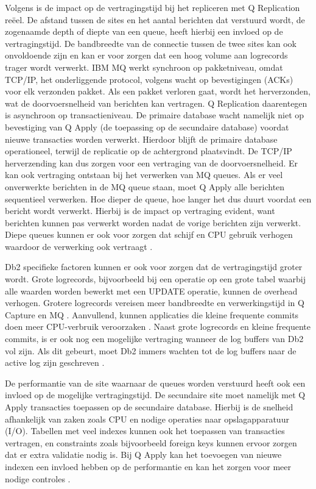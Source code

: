 Volgens \textcite{sharkey_2018_ibm_performance_q_replication} is de impact op de vertragingstijd bij het repliceren met Q Replication reëel.
De afstand tussen de sites en het aantal berichten dat verstuurd wordt, de zogenaamde depth of diepte van een queue, heeft hierbij een invloed op de vertragingstijd.
De bandbreedte van de connectie tussen de twee sites kan ook onvoldoende zijn en kan er voor zorgen dat een hoog volume aan logrecords trager wordt verwerkt.
IBM MQ werkt synchroon op pakketniveau, omdat TCP/IP, het onderliggende protocol, volgens \textcite{borman_2014_tcp} wacht op bevestigingen (ACKs) voor elk verzonden pakket. 
Als een pakket verloren gaat, wordt het herverzonden, wat de doorvoersnelheid van berichten kan vertragen.
Q Replication daarentegen is asynchroon op transactieniveau.
De primaire database wacht namelijk niet op bevestiging van Q Apply (de toepassing op de secundaire database) voordat nieuwe transacties worden verwerkt. 
Hierdoor blijft de primaire database operationeel, terwijl de replicatie op de achtergrond plaatsvindt. 
De TCP/IP herverzending kan dus zorgen voor een vertraging van de doorvoersnelheid.
Er kan ook vertraging ontstaan bij het verwerken van MQ queues.
Als er veel onverwerkte berichten in de MQ queue staan, moet Q Apply alle berichten sequentieel verwerken.
Hoe dieper de queue, hoe langer het dus duurt voordat een bericht wordt verwerkt.
Hierbij is de impact op vertraging evident, want berichten kunnen pas verwerkt worden nadat de vorige berichten zijn verwerkt.
Diepe queues kunnen er ook voor zorgen dat schijf en CPU gebruik verhogen waardoor de verwerking ook vertraagt \autocite{sharkey_2018_ibm_performance_q_replication}.

Db2 specifieke factoren kunnen er ook voor zorgen dat de vertragingstijd groter wordt.
Grote logrecords, bijvoorbeeld bij een operatie op een grote tabel waarbij alle waarden worden bewerkt met een UPDATE operatie, kunnen de overhead verhogen.
Grotere logrecords vereisen meer bandbreedte en verwerkingstijd in Q Capture en MQ \autocite{ibm_2004_ibm_replication_event_publishing_guide}.
Aanvullend, kunnen applicaties die kleine frequente commits doen meer CPU-verbruik veroorzaken \autocite{ibm_2025_infosphere_batch_frequency_param}.
Naast grote logrecords en kleine frequente commits, is er ook nog een mogelijke vertraging wanneer de log buffers van Db2 vol zijn.
Als dit gebeurt, moet Db2 immers wachten tot de log buffers naar de active log zijn geschreven \autocite{ibm_2026_how_db2_writes_active_logs}.

De performantie van de site waarnaar de queues worden verstuurd heeft ook een invloed op de mogelijke vertragingstijd.
De secundaire site moet namelijk met Q Apply transacties toepassen op de secundaire database.
Hierbij is de snelheid afhankelijk van zaken zoals CPU en nodige operaties naar opslagapparatuur (I/O).
Tabellen met veel indexes kunnen ook het toepassen van transacties vertragen, en constraints zoals bijvoorbeeld foreign keys kunnen ervoor zorgen dat er extra validatie nodig is.
Bij Q Apply kan het toevoegen van nieuwe indexen een invloed hebben op de performantie en kan het zorgen voor meer nodige controles \autocite{ballard_2016_understanding_q_replication_high_availability}.

